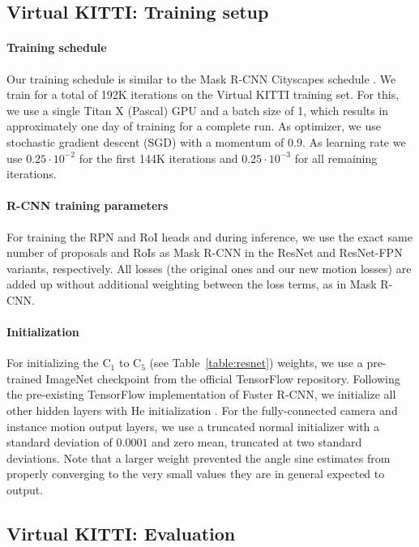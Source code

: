 \subsection{Virtual KITTI: Training setup}
\label{ssec:setup}

\paragraph{Training schedule}
Our training schedule is similar to the Mask R-CNN Cityscapes schedule \cite{MaskRCNN}.
We train for a total of 192K iterations on the Virtual KITTI training set.
For this, we use a single Titan X (Pascal) GPU and a batch size of 1,
which results in approximately one day of training for a complete run.
As optimizer, we use stochastic gradient descent (SGD) \cite{SGD} with a
momentum of $0.9$.
As learning rate we use $0.25 \cdot 10^{-2}$ for the
first 144K iterations and $0.25 \cdot 10^{-3}$ for all remaining iterations.

\paragraph{R-CNN training parameters}
For training the RPN and RoI heads and during inference,
we use the exact same number of proposals and RoIs as Mask R-CNN in
the ResNet and ResNet-FPN variants, respectively.
All losses (the original ones and our new motion losses)
are added up without additional weighting between the loss terms,
as in Mask R-CNN.

\paragraph{Initialization}
For initializing the  C$_1$ to C$_5$ (see Table~\ref{table:resnet}) weights, we use a pre-trained
ImageNet \cite{ImageNet} checkpoint from the official TensorFlow repository.
Following the pre-existing TensorFlow implementation of Faster R-CNN,
we initialize all other hidden layers with He initialization \cite{He}.
For the fully-connected camera and instance motion output layers,
we use a truncated normal initializer with a standard
deviation of $0.0001$ and zero mean, truncated at two standard deviations.
Note that a larger weight prevented the
angle sine estimates from properly converging to the very small values they
are in general expected to output.

\subsection{Virtual KITTI: Evaluation}
\label{ssec:vkitti}

